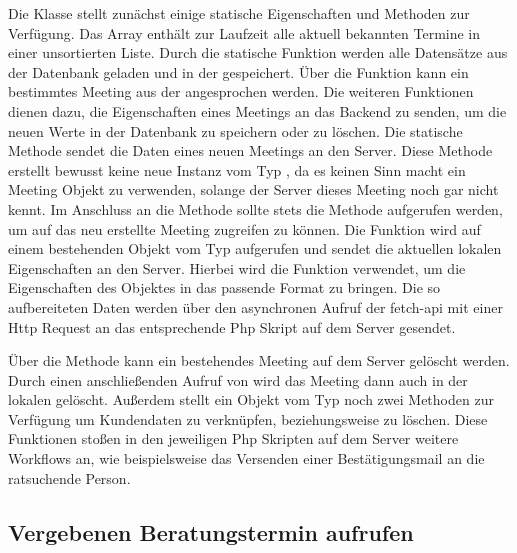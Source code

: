 Die Klasse  stellt zunächst einige statische Eigenschaften und
Methoden zur Verfügung. Das Array  enthält zur Laufzeit alle
aktuell bekannten Termine in einer unsortierten Liste. Durch die statische
Funktion  werden alle Datensätze aus der Datenbank
geladen und in der  gespeichert. Über die Funktion
 kann ein bestimmtes Meeting aus der 
angesprochen werden. Die weiteren Funktionen dienen dazu, die Eigenschaften
eines Meetings an das Backend zu senden, um die neuen Werte in der Datenbank zu
speichern oder zu löschen. Die statische Methode
 sendet die Daten eines neuen Meetings an den
Server. Diese Methode erstellt bewusst keine neue Instanz vom Typ
, da es keinen Sinn macht ein Meeting Objekt zu verwenden,
solange der Server dieses Meeting noch gar nicht kennt. Im Anschluss an die
 Methode sollte stets die Methode
 aufgerufen werden, um auf das neu erstellte Meeting
zugreifen zu können. Die Funktion  wird auf einem
bestehenden Objekt vom Typ  aufgerufen und sendet die aktuellen
lokalen Eigenschaften an den Server. Hierbei wird die Funktion
 verwendet, um die Eigenschaften des Objektes in das
passende Format zu bringen. Die so aufbereiteten Daten werden über den
asynchronen Aufruf der \gls{fetch-api} mit einer Http Request an das
entsprechende Php Skript auf dem Server gesendet.



Über die Methode  kann ein bestehendes Meeting auf dem Server gelöscht werden. Durch einen anschließenden Aufruf von  wird das Meeting dann auch in der lokalen  gelöscht. Außerdem stellt ein Objekt vom Typ  noch zwei Methoden zur Verfügung um Kundendaten zu verknüpfen, beziehungsweise zu löschen. Diese Funktionen stoßen in den jeweiligen Php Skripten auf dem Server weitere Workflows an, wie beispielsweise das Versenden einer Bestätigungsmail an die ratsuchende Person.





\subsection{Vergebenen Beratungstermin aufrufen}

